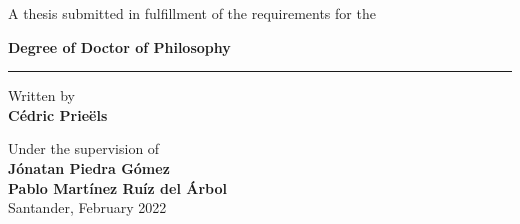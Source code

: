 \documentclass[a4paper, 10pt, openright]{report}
\begin{document}
\begin{titlepage}
	{\vspace{10pt} \Large A thesis submitted in fulfillment of the requirements for the \par \vspace{-6pt} \LARGE \textbf{Degree of Doctor of Philosophy} \vspace{20pt} \par \noindent\rule{15cm}{0.4pt}}
	
	\vspace{0.8cm}
	{\Large Written by \\ \textbf{C\'{e}dric Prie\"{e}ls}\par}
	\vspace{0.5cm}
	{\Large Under the supervision of \\ \textbf{J\'{o}natan Piedra G\'{o}mez} \\
	\vspace{-10pt}
	\textbf{Pablo Mart\'{i}nez Ru\'{i}z del \'{A}rbol}\\}
	\vspace{2.7cm}
	{\LARGE Santander, February 2022}
	\vfill

\end{titlepage}


\thispagestyle{empty}
\phantom{a}
\vfill
\newpage
\end{document}
